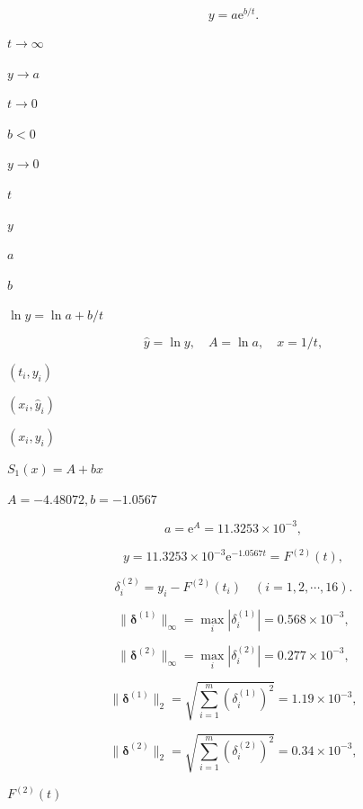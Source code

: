 \documentclass[UTF8,fontset=fandol,a4paper]{ctexart}
\begin{document}
\[
y=a\mathrm e^{b/t}.
\]

\noindent $t\to\infty$\par

\noindent $y\to a$\par

\noindent $t\to0$\par

\noindent $b<0$\par

\noindent $y\to0$\par

\noindent $t$\par

\noindent $y$\par

\noindent $a$\par

\noindent $b$\par

\noindent $\ln y=\ln a+b/t$\par

\[
\hat y=\ln y,\quad A=\ln a,\quad x=1/t,
\]

\noindent $(t_i,y_i)$\par

\noindent $(x_i,\hat y_i)$\par

\noindent $(x_i,y_i)$\par

\noindent $S_1(x)=A+bx$\par

\noindent $A=-4.48072,b=-1.0567$\par

\[
a=\mathrm e^A=11.3253\times10^{-3},
\]

\[
y=11.3253\times10^{-3}\mathrm e^{-1.0567t}=F^{(2)}(t),
\]

\[
\delta_i^{(2)}=y_i-F^{(2)}(t_i)\quad(i=1,2,\cdots,16).
\]

\[
\|\boldsymbol\delta^{(1)}\|_\infty=\max_i|\delta_i^{(1)}|=0.568\times10^{-3},
\]

\[
\|\boldsymbol\delta^{(2)}\|_\infty=\max_i|\delta_i^{(2)}|=0.277\times10^{-3},
\]

\[
\|\boldsymbol\delta^{(1)}\|_2=\sqrt{\sum_{i=1}^m(\delta_i^{(1)})^2}=1.19\times10^{-3},
\]

\[
\|\boldsymbol\delta^{(2)}\|_2=\sqrt{\sum_{i=1}^m(\delta_i^{(2)})^2}=0.34\times10^{-3},
\]

\noindent $F^{(2)}(t)$\par
\end{document}
